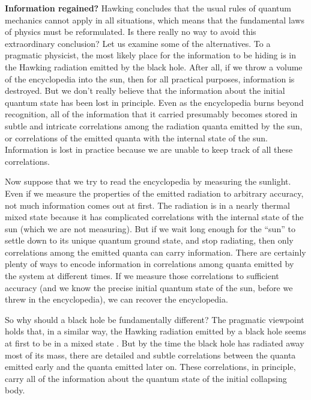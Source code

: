 \bigskip
{\bf Information regained?}
Hawking concludes that the usual rules of quantum mechanics cannot apply in all
situations, which means that the fundamental laws of physics must be
reformulated.  Is there really no way to avoid this extraordinary conclusion?
Let us examine some of the alternatives.\lref{}\lref{}
\bigskip
{}
To a pragmatic physicist, the most likely place for the information to be
hiding is in the Hawking radiation emitted by the black hole.  After all, if we
throw a volume of the encyclopedia into the sun, then for all practical
purposes,
information is destroyed.  But we don't really believe that the information
about the initial quantum state has been lost in principle.  Even as the
encyclopedia burns beyond recognition, all of the information that it carried
presumably becomes stored in subtle and intricate correlations among the
radiation quanta emitted by the sun, or correlations of the emitted quanta with
the internal state of the sun.  Information is lost in practice because we are
unable to keep track of all these correlations.

Now suppose that we try to read the encyclopedia by measuring the sunlight.
Even if we measure the properties of the emitted radiation to arbitrary
accuracy, not much information comes out at first.  The radiation is in a
nearly thermal mixed state because it has complicated correlations with the
internal state of the sun (which we are not measuring).
But if we wait long enough for the ``sun'' to settle down to its unique quantum
ground state, and stop radiating, then only correlations among the emitted
quanta can carry information.  There are certainly plenty of ways to encode
information in correlations among quanta emitted by the system at different
times.  If we measure those correlations to sufficient accuracy (and we know
the precise initial quantum state of the sun, before we threw in the
encyclopedia), we can recover
the encyclopedia.

So why should a black hole be fundamentally different?  The pragmatic viewpoint
holds that, in a similar way, the Hawking
radiation emitted by a black hole seems at first to be in a mixed state \page.
But
by the time the black hole has radiated away most of its mass, there are
detailed and subtle correlations between the quanta emitted early and the
quanta emitted later on.  These correlations, in principle, carry all of the
information about the quantum state of the initial collapsing body.

